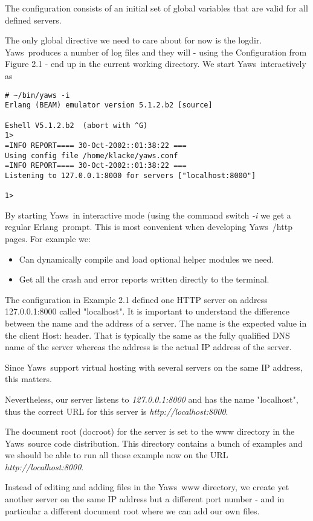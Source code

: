 \documentclass[11pt,oneside,english]{book}
\newcommand{\Erlang}            %
        {{\sc Erlang}}
\newcommand{\Yaws}            %
        {{\sc Yaws}}
\begin{document}
The configuration consists of an initial set of global
variables that are valid for all defined servers.

The only global directive we need to care about for now is the logdir.
\Yaws\  produces a number of log files and they will -
using the Configuration from Figure 2.1 - end up in the current
working directory.
We start \Yaws\  interactively as
\begin{verbatim}
# ~/bin/yaws -i
Erlang (BEAM) emulator version 5.1.2.b2 [source]

Eshell V5.1.2.b2  (abort with ^G)
1>
=INFO REPORT==== 30-Oct-2002::01:38:22 ===
Using config file /home/klacke/yaws.conf
=INFO REPORT==== 30-Oct-2002::01:38:22 ===
Listening to 127.0.0.1:8000 for servers ["localhost:8000"]

1>
\end{verbatim}

By starting \Yaws\  in interactive mode (using the command switch \textit{-i}
we get a regular \Erlang\  prompt. This is most convenient when developing
\Yaws\ /http pages. For example we:
\begin{itemize}
\item{Can dynamically compile and load optional helper modules we need.}
\item{Get all the crash and error reports written directly to the
terminal.}
\end{itemize}

The configuration in Example 2.1 defined one HTTP server on
address 127.0.0.1:8000 called "localhost".
It is important to understand the difference between the name and
the address of a server. The name is the expected value in the
client Host: header. That is typically the same as the fully qualified
DNS name of the server whereas the address is the actual
IP address of the server.

Since \Yaws\  support virtual hosting with several servers on the same
IP address, this matters.

Nevertheless, our server listens to \textit{127.0.0.1:8000} and
has the name "localhost", thus the correct URL for this server
is \textit{http://localhost:8000}.

The document root (docroot) for the server is set to the www directory in the
\Yaws\  source code distribution. This directory contains a bunch of
examples and we should be able to run all those example now on the
URL  \textit{http://localhost:8000}.

Instead of editing and adding files in the \Yaws\  www directory, we
create yet another server on the same IP address but a different port
number - and in particular a different document root where we can add
our own files.
\end{document}
